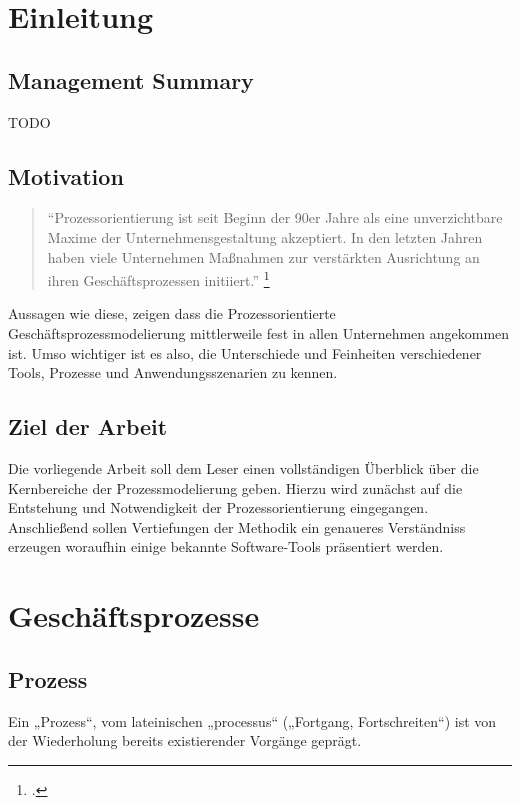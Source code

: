 \section{Einleitung}


\subsection{Management Summary}

TODO

\subsection{Motivation}

\begin{quote}
"`Prozessorientierung ist seit Beginn der 90er Jahre als eine unverzichtbare 
Maxime der Unternehmensgestaltung akzeptiert. In den letzten Jahren 
haben viele Unternehmen Maßnahmen
 zur verstärkten Ausrichtung an ihren Geschäftsprozessen initiiert."' 
\footcite[S.182]{prozessmanagement:leitfaden}
\end{quote}


Aussagen wie diese, zeigen dass die Prozessorientierte
Geschäftsprozessmodelierung mittlerweile fest in allen Unternehmen angekommen ist.
Umso wichtiger ist es also, die Unterschiede und Feinheiten verschiedener Tools,
Prozesse und Anwendungsszenarien zu kennen.

\subsection{Ziel der Arbeit}

Die vorliegende Arbeit soll dem Leser einen vollständigen Überblick über die
Kernbereiche der Prozessmodelierung geben. Hierzu wird zunächst auf die
Entstehung und Notwendigkeit der Prozessorientierung eingegangen. Anschließend
sollen Vertiefungen der Methodik ein genaueres Verständniss erzeugen woraufhin
einige bekannte Software-Tools präsentiert werden.

\clearpage
\section{Geschäftsprozesse}

\subsection{Prozess}


Ein „Prozess“, vom lateinischen „processus“ („Fortgang, Fortschreiten“) ist von
der Wiederholung bereits existierender Vorgänge geprägt.

